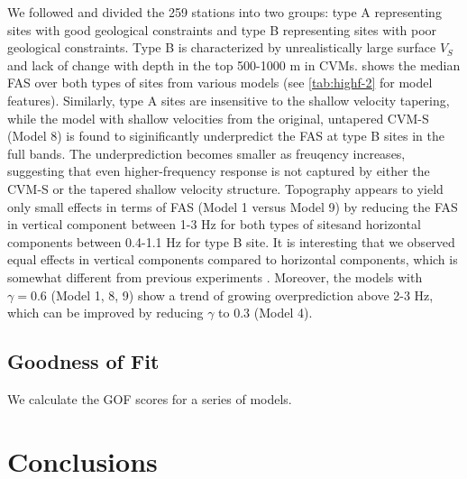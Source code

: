 We followed \citet{huCalibrationNearsurfaceSeismic2021} and divided the 259 stations into two groups: type A representing sites with good geological constraints and type B representing sites with poor geological constraints. Type B is characterized by unrealistically large surface $V_S$ and lack of change with depth in the top 500-1000 m in CVMs.  shows the median FAS over both types of sites from various models (see \cref{tab:highf-2} for model features). Similarly, type A sites are insensitive to the shallow velocity tapering, while the model with shallow velocities from the original, untapered CVM-S (Model 8) is found to siginificantly underpredict the FAS at type B sites in the full bands. The underprediction becomes smaller as freuqency increases, suggesting that even higher-frequency response is not captured by either the CVM-S or the tapered shallow velocity structure. Topography appears to yield only small effects in terms of FAS (Model 1 versus Model 9) by reducing the FAS in vertical component between 1-3 Hz for both types of sitesand horizontal components between 0.4-1.1 Hz for type B site. It is interesting that we observed equal effects in vertical components compared to horizontal components, which is somewhat different from previous experiments \citep[][and the references therein]{massaOverviewTopographicEffects2014}. Moreover, the models with $\gamma=0.6$ (Model 1, 8, 9) show a trend of growing overprediction above 2-3 Hz, which can be improved by reducing $\gamma$ to 0.3 (Model 4).

\subsection{Goodness of Fit}
We calculate the GOF scores for a series of models. 

\section{Conclusions}


